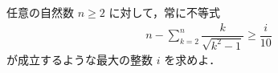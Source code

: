 \documentclass[../../main.tex]{subfiles}
\begin{document}
任意の自然数 $n \ge 2$ に対して，常に不等式
\begin{align}
  n - \sum_{k=2}^{n} \dfrac{k}{\sqrt{k^2 - 1}} \ge \dfrac{i}{10}
\end{align}
が成立するような最大の整数 $i$ を求めよ．
\end{document}
